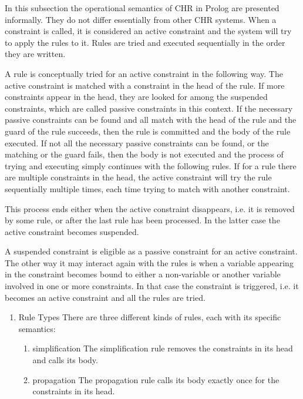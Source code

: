 \documentclass[thesis-solanki.tex]{subfiles}
\begin{document}
\begin{enumerate}
\begin{enumerate}
In this subsection the operational semantics of CHR in Prolog are presented informally. They do not differ essentially from other CHR systems.
When a constraint is called, it is considered an active constraint and the system will try to apply the rules to it. Rules are tried and executed sequentially in the order they are written.

\cite{website:swiprologsyntaxandsemantics}

A rule is conceptually tried for an active constraint in the following way. The active constraint is matched with a constraint in the head of the rule. If more constraints appear in the head, they are looked for among the suspended constraints, which are called passive constraints in this context. If the necessary passive constraints can be found and all match with the head of the rule and the guard of the rule succeeds, then the rule is committed and the body of the rule executed. If not all the necessary passive constraints can be found, or the matching or the guard fails, then the body is not executed and the process of trying and executing simply continues with the following rules. If for a rule there are multiple constraints in the head, the active constraint will try the rule sequentially multiple times, each time trying to match with another constraint.

This process ends either when the active constraint disappears, i.e. it is removed by some rule, or after the last rule has been processed. In the latter case the active constraint becomes suspended.

A suspended constraint is eligible as a passive constraint for an active constraint. The other way it may interact again with the rules is when a variable appearing in the constraint becomes bound to either a non-variable or another variable involved in one or more constraints. In that case the constraint is triggered, i.e. it becomes an active constraint and all the rules are tried.
\begin{enumerate}

\item Rule Types There are three different kinds of rules, each with its specific semantics:
\begin{enumerate}

\item simplification
The simplification rule removes the constraints in its head and calls its body.

\item propagation
The propagation rule calls its body exactly once for the constraints in its head.


\end{enumerate}
\end{enumerate}
\end{enumerate}
\end{enumerate}
\end{document}
